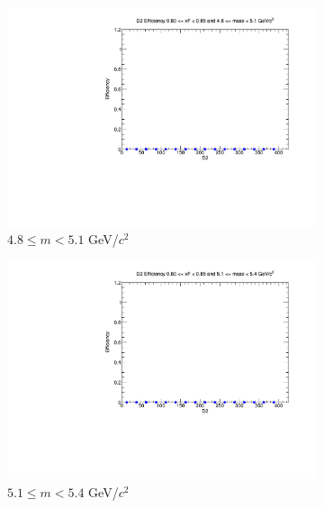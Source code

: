 \documentclass[11pt]{article}
\begin{document}
\begin{figure}[p]
\begin{subfigure}[b]{0.32\textwidth}
        \includegraphics[width=\textwidth]{./kTrackerEfficiencyPlots/D2_Efficiency_xF16_mass2.pdf}
        \caption{$4.8 \leq m < 5.1$ GeV/$c^2$}
    \end{subfigure}\vspace{0.5cm}
    \begin{subfigure}[b]{0.32\textwidth}
        \centering
        \includegraphics[width=\textwidth]{./kTrackerEfficiencyPlots/D2_Efficiency_xF16_mass3.pdf}
        \caption{$5.1 \leq m < 5.4$ GeV/$c^2$}
    \end{subfigure}\hfill
    \begin{subfigure}[b]{0.32\textwidth}
        \centering

\end{subfigure}
\end{figure}
\end{document}
